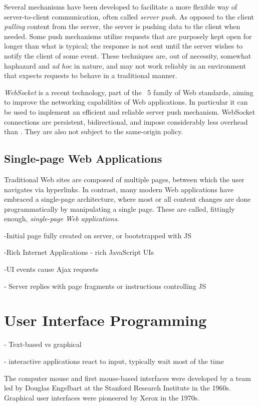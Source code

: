 Several mechanisms have been developed to facilitate a more flexible way of server-to-client communication, often called \emph{server push}. As opposed to the client \emph{pulling} content from the server, the server is pushing data to the client when needed. Some push mechanisms utilize  requests that are purposely kept open for longer than what is typical; the response is not sent until the server wishes to notify the client of some event. These techniques are, out of necessity, somewhat haphazard and \emph{ad hoc} in nature, and may not work reliably in an environment that expects  requests to behave in a traditional manner.

\emph{WebSocket} is a recent technology, part of the ~5 family of Web standards, aiming to improve the networking capabilities of Web applications. In particular it can be used to implement an efficient and reliable server push mechanism. WebSocket connections are persistent, bidirectional, and impose considerably less overhead than . They are also not subject to the same-origin policy.

\subsection{Single-page Web Applications}

Traditional Web sites are composed of multiple pages, between which the user navigates via hyperlinks. In contrast, many modern Web applications have embraced a single-page architecture, where most or all content changes are done programmatically by manipulating a single  page. These are called, fittingly enough, \emph{single-page Web applications}.

-Initial page fully created on server, or bootstrapped with JS

-Rich Internet Applications - rich JavaScript UIs

-UI events cause Ajax requests

- Server replies with page fragments or instructions controlling JS

\section{User Interface Programming}

- Text-based vs graphical

- interactive applications react to input, typically wait most of the time

The computer mouse and first mouse-based interfaces were developed by a team led by Douglas Engelbart at the Stanford Research Institute in the \num{1960s}. Graphical user interfaces were pioneered by Xerox in the \num{1970s}.

